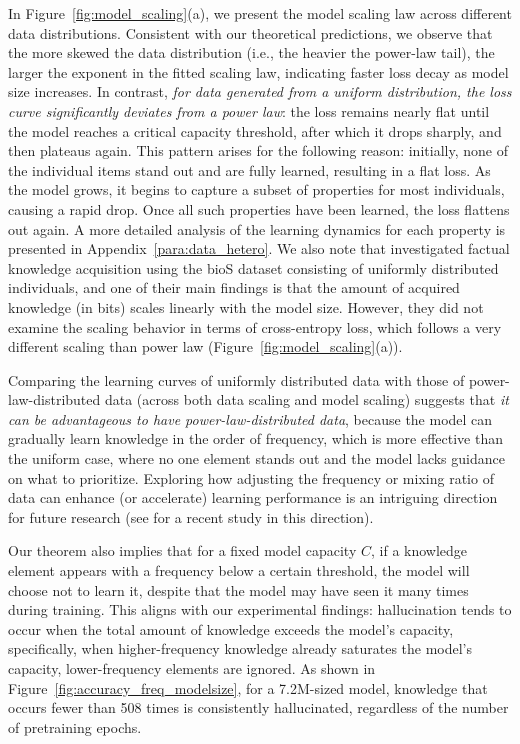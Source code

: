 \documentclass[11pt]{article}
\theoremstyle{plain}
\theoremstyle{definition}
\newcommand{\capacity}{C}
\begin{document}
In Figure~\ref{fig:model_scaling}(a), we present the model scaling law across different data distributions. Consistent with our theoretical predictions, we observe that the more skewed the data distribution (i.e., the heavier the power-law tail), the larger the exponent in the fitted scaling law, indicating faster loss decay as model size increases. In contrast, 
{\em for data generated from a uniform distribution, the loss curve significantly deviates from a power law}: the loss remains nearly flat until the model reaches a critical capacity threshold, after which it drops sharply, and then plateaus again. 
This pattern arises for the following reason: initially, none of the individual items stand out and are fully learned, resulting in a flat loss. As the model grows, it begins to capture a subset of properties for most individuals, causing a rapid drop. Once all such properties have been learned, the loss flattens out again. A more detailed analysis of the learning dynamics for each property is presented in Appendix~\ref{para:data_hetero}. 
We also note that \citet{allen2024physics} investigated factual knowledge acquisition using the bioS dataset consisting of uniformly distributed individuals, and one of their main findings is that the amount of acquired knowledge (in bits) scales linearly with the model size. However, they did not examine the scaling behavior in terms of cross-entropy loss, which follows a very different scaling than power law (Figure~\ref{fig:model_scaling}(a)).

Comparing the learning curves of uniformly distributed data with those of power-law-distributed data (across both data scaling and model scaling) suggests that {\em it can be advantageous to have power-law-distributed data}, because the model can gradually learn knowledge in the order of frequency, which is more effective than the uniform case, where no one element stands out and the model lacks guidance on what to prioritize. 
Exploring how adjusting the frequency or mixing ratio of data can enhance (or accelerate) learning performance is an intriguing direction for future research (see \citep{gu2025data} for a recent study in this direction).

Our theorem also implies that for a fixed model capacity $\capacity$, if a knowledge element appears with a frequency below a certain threshold, the model will choose not to learn it, despite that the model may have seen it many times during training. This aligns with our experimental findings: hallucination tends to occur when the total amount of knowledge exceeds the model's capacity, specifically, when higher-frequency knowledge already saturates the model's capacity, lower-frequency elements are ignored. As shown in Figure~\ref{fig:accuracy_freq_modelsize}, for a 7.2M-sized model, knowledge that occurs fewer than 508 times is consistently hallucinated, regardless of the number of pretraining epochs.
\end{document}

